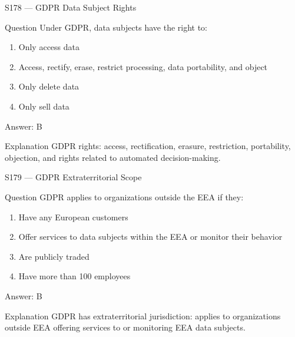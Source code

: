 \documentclass[aspectratio=169,8pt]{beamer}
\begin{document}
	\begin{frame}{S178 --- GDPR Data Subject Rights}
		\begin{block}{Question}
			Under GDPR, data subjects have the right to:
			\begin{enumerate}
				\item Only access data
				\item Access, rectify, erase, restrict processing, data portability, and object
				\item Only delete data
				\item Only sell data
			\end{enumerate}
		\end{block}
		\begin{exampleblock}{Answer: B}\end{exampleblock}
		\begin{block}{Explanation}
			GDPR rights: access, rectification, erasure, restriction, portability, objection, and rights related to automated decision-making.
		\end{block}
	\end{frame}
	
	\begin{frame}{S179 --- GDPR Extraterritorial Scope}
		\begin{block}{Question}
			GDPR applies to organizations outside the EEA if they:
			\begin{enumerate}
				\item Have any European customers
				\item Offer services to data subjects within the EEA or monitor their behavior
				\item Are publicly traded
				\item Have more than 100 employees
			\end{enumerate}
		\end{block}
		\begin{exampleblock}{Answer: B}\end{exampleblock}
		\begin{block}{Explanation}
			GDPR has extraterritorial jurisdiction: applies to organizations outside EEA offering services to or monitoring EEA data subjects.
		\end{block}
	\end{frame}
	
\end{document}

